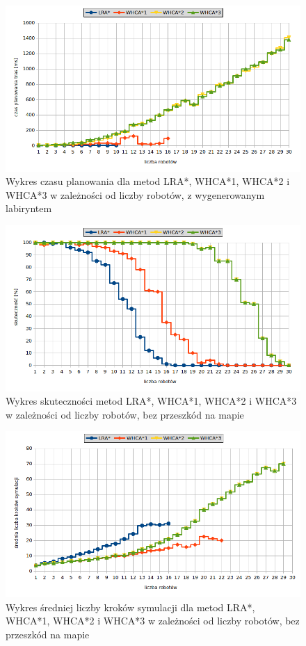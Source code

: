 \begin{figure}
	\centering
	\includegraphics[width=0.8\columnwidth]{img/plots/test-steps-maze-robots-calctime}
	\caption{Wykres czasu planowania dla metod LRA*, WHCA*1, WHCA*2 i WHCA*3 w zależności od liczby robotów, z wygenerowanym labiryntem}
	\label{fig:test-steps-maze-robots-calctime}
\end{figure}
\begin{figure}
	\centering
	\includegraphics[width=0.8\columnwidth]{img/plots/test-steps-empty-robots-eff}
	\caption{Wykres skuteczności metod LRA*, WHCA*1, WHCA*2 i WHCA*3 w zależności od liczby robotów, bez przeszkód na mapie}
	\label{fig:test-steps-empty-robots-eff}
\end{figure}
\begin{figure}
	\centering
	\includegraphics[width=0.8\columnwidth]{img/plots/test-steps-empty-robots-steps}
	\caption{Wykres średniej liczby kroków symulacji dla metod LRA*, WHCA*1, WHCA*2 i WHCA*3 w zależności od liczby robotów, bez przeszkód na mapie}
	\label{fig:test-steps-empty-robots-steps}
\end{figure}
